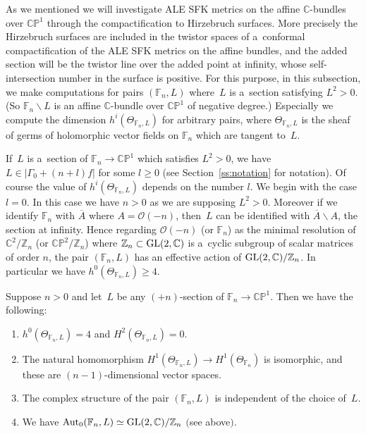 As we mentioned we will investigate ALE SFK metrics on the af\/f\/ine $\mathbb{C}$-bundles over $\mathbb{CP}^1$ through
the compactif\/ication to Hirzebruch surfaces.
More precisely the Hirzebruch surfaces are included in the twistor spaces of a~conformal compactif\/ication of the ALE
SFK metrics on the af\/f\/ine bundles, and the added section will be the twistor line over the added point at
inf\/inity, whose self-intersection number in the surface is positive.
For this purpose, in this subsection, we make computations for pairs $(\mathbb{F}_n,L)$ where~$L$ is a~section
satisfying $L^2>0$.
(So $\mathbb{F}_n\backslash L$ is an af\/f\/ine $\mathbb{C}$-bundle over $\mathbb{CP}^1$ of negative degree.) Especially
we compute the dimension $h^i(\Theta_{\mathbb{F}_n,L})$ for arbitrary pairs, where $\Theta_{\mathbb{F}_n,L}$ is the
sheaf of germs of holomorphic vector f\/ields on $\mathbb{F}_n$ which are tangent to~$L$.

If~$L$ is a~section of $\mathbb{F}_n\to\mathbb{CP}^1$ which satisf\/ies $L^2>0$, we have $L\in |\Gamma_0 + (n+l)f|$ for
some $l\ge 0$ (see Section~\ref{ss:notation} for notation). Of course the value of $h^i(\Theta_{\mathbb{F}_n,L})$
depends on the number $l$.
We begin with the case $l=0$.
In this case we have $n>0$ as we are supposing $L^2>0$.
Moreover if we identify $\mathbb{F}_n$ with $\overline A$ where $A=\mathscr O(-n)$, then~$L$ can be identif\/ied with
$\overline A\backslash A$, the section at inf\/inity.
Hence regarding $\mathscr O(-n)$ (or $\mathbb{F}_n$) as the minimal resolution of $\mathbb{C}^2/\mathbb{Z}_n$ (or
$\mathbb{CP}^2/\mathbb{Z}_n$) where $\mathbb{Z}_n\subset{\rm{GL}}(2,\mathbb{C})$ is a~cyclic subgroup of scalar matrices
of order $n$, the pair $(\mathbb{F}_n,L)$ has an ef\/fective action of ${\rm{GL}}(2,\mathbb{C})/\mathbb{Z}_n$.
In particular we have $h^0(\Theta_{\mathbb{F}_n,L}) \ge 4$.
\begin{Proposition}
\label{prop:l0}
Suppose $n>0$ and let~$L$ be any $(+n)$-section of $\mathbb{F}_n\to\mathbb{CP}^1$.
Then we have the following:
\begin{enumerate}\itemsep=0pt
\item[$(i)$] $h^0(\Theta_{\mathbb{F}_n, L})=4$ and $H^2(\Theta_{\mathbb{F}_n, L})=0$.
\item[$(ii)$] The natural homomorphism $H^1(\Theta_{\mathbb{F}_n, L}) \to H^1(\Theta_{\mathbb{F}_n})$ is isomorphic,
and these are $(n-1)$-dimensional vector spaces.
\item[$(iii)$] The complex structure of the pair $(\mathbb{F}_n,L)$ is independent of the choice of~$L$.
\item[$(iv)$] We have ${\rm{Aut}}_0(\mathbb{F}_n,L)\simeq {\rm{GL}}(2,\mathbb{C})/\mathbb{Z}_n$ $($see above$)$.
\end{enumerate}
\end{Proposition}

